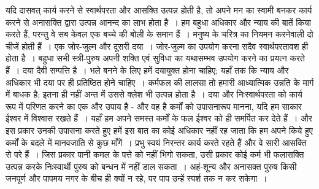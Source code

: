 यदि दासवत् कार्य करने से स्वार्थपरता और आसक्ति उत्पन्न होती है, तो अपने मन का स्वामी बनकर कार्य करने से अनासक्ति द्वारा उत्पन्न आनन्द का लाभ होता है~। हम बहुधा अधिकार और न्याय की बातें किया करते हैं, परन्तु वे सब केवल एक बच्चे की बोली के समान हैं~। मनुष्य के चरित्र का नियमन करनेवाली दो चीजें होती हैं~। एक जोर-जुल्म और दूसरी दया~। जोर-जुल्म का उपयोग करना सदैव स्वार्थपरतावश ही होता है~। बहुधा सभी स्त्री-पुरुष अपनी शक्ति एवं सुविधा का यथासम्भव उपयोग करने का प्रयत्न करते हैं~। दया दैवी सम्पत्ति है~। भले बनने के लिए हमें दयायुक्त होना चाहिए; यहाँ तक कि न्याय और अधिकार भी दया पर ही प्रतिष्ठित होने चाहिए~। कर्मफल की लालसा तो हमारी आध्यात्मिक उन्नति के मार्ग में बाधक है; इतना ही नहीं अन्त में उससे क्लेश भी उत्पन्न होता है~। दया और निःस्वार्थपरता को कार्य रूप में परिणत करने का एक और उपाय है - और वह है कर्मों को उपासनारूप मानना, यदि हम साकार ईश्वर में विश्वास रखते हैं~। यहाँ हम अपने समस्त कर्मों के फल ईश्वर को ही समर्पित कर देते हैं~। और इस प्रकार उनकी उपासना करते हुए हमें इस बात का कोई अधिकार नहीं रह जाता कि हम अपने किये हुए कर्मों के बदले में मानवजाति से कुछ माँगें~। प्रभु स्वयं निरन्तर कार्य करते रहते हैं और वे सारी आसक्ति से परे हैं~। जिस प्रकार पानी कमल के पत्ते को नहीं भिगो सकता, उसी प्रकार कोई कर्म भी फलासक्ति उत्पन्न करके निःस्वार्थी पुरुष को बन्धन में नहीं डाल सकता~। अहं-शून्य और अनासक्त पुरुष किसी जनपूर्ण और पापमय नगर के बीच ही क्यों न रहे, पर पाप उन्हें स्पर्श तक न कर सकेगा~।

